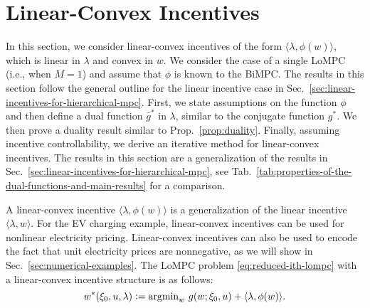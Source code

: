 \section{Linear-Convex Incentives}
\label{sec:linear-convex-incentives}

In this section, we consider linear-convex incentives of the form $\langle \lambda, \phi(w)\rangle$, which is linear in $\lambda$ and convex in $w$.
We consider the case of a single LoMPC (i.e., when $M = 1$) and assume that $\phi$ is known to the BiMPC.
The results in this section follow the general outline for the linear incentive case in Sec.~\ref{sec:linear-incentives-for-hierarchical-mpc}.
First, we state assumptions on the function $\phi$ and then define a dual function $\bar{g}^*$ in $\lambda$, similar to the conjugate function $g^*$.
We then prove a duality result similar to Prop.~\ref{prop:duality}.
Finally, assuming incentive controllability, we derive an iterative method for linear-convex incentives.
The results in this section are a generalization of the results in Sec.~\ref{sec:linear-incentives-for-hierarchical-mpc}, see Tab.~\ref{tab:properties-of-the-dual-functions-and-main-results} for a comparison.

A linear-convex incentive $\langle \lambda, \phi(w) \rangle$ is a generalization of the linear incentive $\langle \lambda, w\rangle$.
For the EV charging example, linear-convex incentives can be used for nonlinear electricity pricing.
Linear-convex incentives can also be used to encode the fact that unit electricity prices are nonnegative, as we will show in Sec.~\ref{sec:numerical-examples}.
The LoMPC problem \eqref{eq:reduced-ith-lompc} with a linear-convex incentive structure is as follows:
\begin{equation}
\label{eq:linear-convex-incentivized-lompc}
w^*(\xi_0, u, \lambda) := \textstyle{\operatorname*{argmin}}_{w} \ g(w; \xi_0, u) + \langle \lambda, \phi(w) \rangle.
\end{equation}

